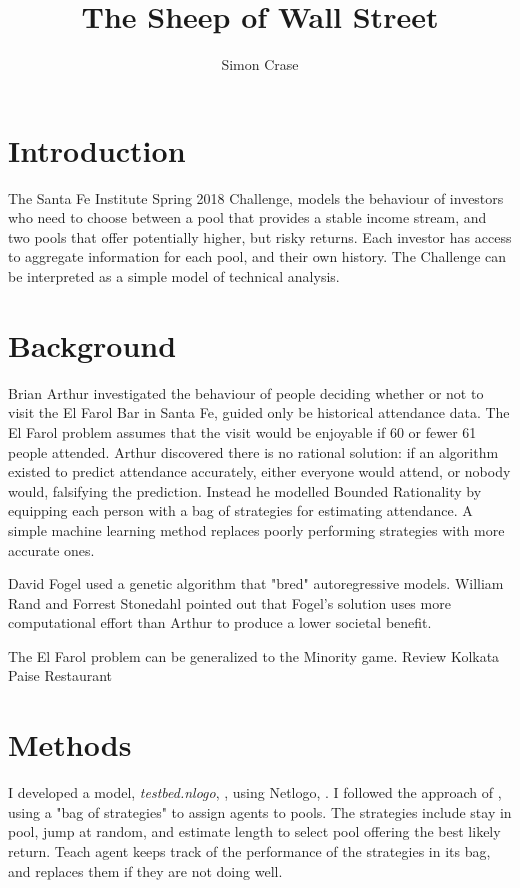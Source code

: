 \documentclass[]{article}
\title{The Sheep of Wall Street}
\author{Simon Crase}
\begin{document}
\maketitle

\begin{abstract}

\end{abstract}

\section{Introduction}
The Santa Fe Institute Spring 2018 Challenge\cite{Challenge:2018}, models the behaviour of investors who need to choose between a pool that provides a stable income stream, and two pools that offer potentially higher, but risky returns. Each investor has access to aggregate information for each pool, and their own history. The Challenge can be interpreted as a simple model of technical analysis\cite{romero2014hedge}.

\section{Background}
Brian Arthur \cite{arthur1994inductive} investigated the behaviour of people deciding whether or not to visit the El Farol Bar in Santa Fe, guided only be historical attendance data. The El Farol problem assumes that the visit would be enjoyable if 60 or fewer 61 people attended. Arthur discovered there is no rational solution: if an algorithm existed to predict attendance accurately, either everyone would attend, or nobody would, falsifying the prediction. Instead he modelled Bounded Rationality by equipping each person with a bag of strategies for estimating attendance. A simple machine learning method replaces poorly performing strategies with more accurate ones.


David Fogel \cite{fogel1999inductive} used a genetic algorithm that "bred" autoregressive models. William Rand and Forrest Stonedahl\cite{rand2007farol} pointed out that Fogel's solution uses more computational effort than Arthur to produce a lower societal benefit.

The El Farol problem can be generalized to the Minority game. Review \cite{szabo2007evolutionary} Kolkata Paise Restaurant \cite{chakrabarti2007kolkata}
\cite{chakrabarti2009kolkata}

\section{Methods}
I developed a model, \emph{testbed.nlogo}, \cite{Github:2018}, using Netlogo, \cite{Wilensky:1999}. I followed the approach of \cite{arthur1994inductive}, using a "bag of strategies" to assign agents to pools. The strategies include stay in pool, jump at random, and estimate length to select pool offering the best likely return. Teach agent keeps track of the performance of the strategies in its bag, and replaces them if they are not doing well.
\end{document}
